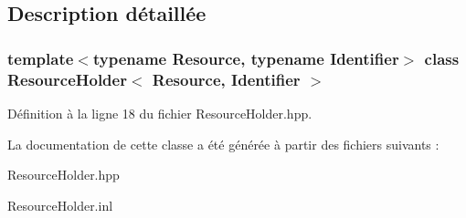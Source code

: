\subsection{Description détaillée}
\subsubsection*{template$<$typename Resource, typename Identifier$>$\newline
class Resource\+Holder$<$ Resource, Identifier $>$}



Définition à la ligne 18 du fichier Resource\+Holder.\+hpp.



La documentation de cette classe a été générée à partir des fichiers suivants \+:\begin{DoxyCompactItemize}
\item 
Resource\+Holder.\+hpp\item 
Resource\+Holder.\+inl\end{DoxyCompactItemize}
